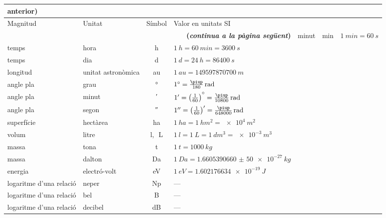 \begin{ThreePartTable}
\begin{longtable}[h]{llcl}
{{   anterior})}\\
   \toprule[1pt]
    Magnitud & Unitat &  Símbol & Valor en unitats SI\\
   \midrule
   \endhead
   \midrule
   \multicolumn{4}{r}{\sffamily\bfseries\color{NavyBlue}(\emph{continua a la pàgina següent})}
   \endfoot
   \insertTableNotes
   \endlastfoot
   temps & minut &  \si{min}& $\SI{1}{min} = \SI{60}{s}$ \\
   temps & hora & \si{h} & $\SI{1}{h} = \SI{60}{min} = \SI{3600}{s}$ \\
   temps & dia & \si{d} & $\SI{1}{d} = \SI{24}{h} = \SI{86400}{s}$\\
   longitud & unitat astronòmica\tnote{a} &  \si{au} &  $\SI{1}{au} =  \SI{149597870700}{m}$ \\
   angle pla & grau &  \si{\degree} &   $\ang{1} = \frac{\piup}{180}\si{\,rad}$ \\
   angle pla & minut & \si{\arcminute} & $\ang{;1;} = \big(\frac{1}{60}\big)\raisebox{1.5mm}{\si{\degree}} = \frac{\piup}{10800}\si{\,rad}$ \\[1mm]
   angle pla & segon & \si{\arcsecond} & $\ang{;;1} = \big(\frac{1}{60}\big)' = \frac{\piup}{648000}\si{\,rad}$ \\[1mm]
   superfície & hectàrea\tnote{b} & \si{ha} & $\SI{1}{ha} = \SI{1}{hm^2} = \SI{e4}{m^2}$\\
   volum & litre\tnote{c} &  \si{l},\si{\,L} & $\SI{1}{l} = \SI{1}{L} = \SI{1}{dm^3} = \SI{e-3}{m^3}$ \\
   massa & tona\tnote{d} & \si{t} & $\SI{1}{t} = \SI{1000}{kg}$\\
   massa & dalton\tnote{e} & Da & $\SI{1}{Da} = \SI{1,6605390660(50)e-27}{kg}$\\
   energia & electró-volt\tnote{f} & eV & $\SI{1}{eV} = \SI{1,602176634e-19}{J}$ \\
   logaritme d'una relació & neper\tnote{g} & \si{Np} & ---\\
   logaritme d'una relació & bel\tnote{g} &  \si{B} & ---\\
   logaritme d'una relació & decibel\tnote{g} & \si{dB} & ---\\
   \bottomrule[1pt]
\end{longtable}
\end{ThreePartTable}
\index{\si{\degree}}

